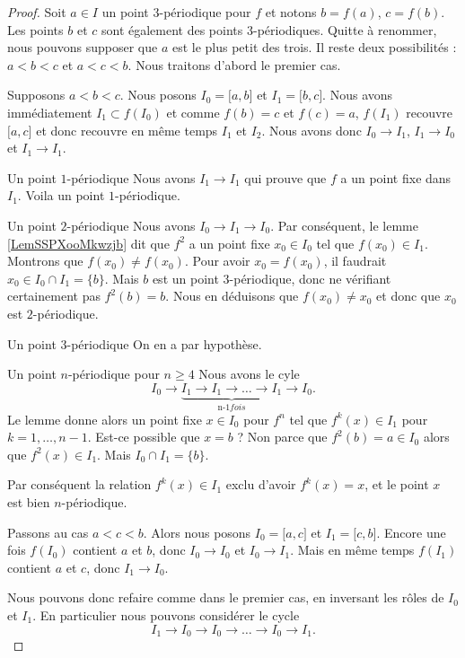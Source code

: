 \begin{proof}
    Soit \( a\in I\) un point \( 3\)-périodique pour \( f\) et notons \( b=f(a)\), \( c=f(b)\). Les points \( b\) et \( c\) sont également des points \( 3\)-périodiques. Quitte à renommer, nous pouvons supposer que \( a\) est le plus petit des trois. Il reste deux possibilités : \( a<b<c\) et \( a<c<b\). Nous traitons d'abord le premier cas.

    Supposons \( a<b<c\). Nous posons \( I_0=\mathopen[ a , b \mathclose]\) et \( I_1=\mathopen[ b , c \mathclose]\). Nous avons immédiatement \( I_1\subset f(I_0)\) et comme \( f(b)=c\) et \( f(c)=a\), \( f(I_1)\) recouvre \( \mathopen[ a , c \mathclose]\) et donc recouvre en même temps \( I_1\) et \( I_2\). Nous avons donc \( I_0\to I_1\), \( I_1\to I_0\) et \( I_1\to I_1\).
    \begin{subproof}
    \item[Un point \( 1\)-périodique]
        Nous avons \( I_1\to I_1\) qui prouve que \( f\) a un point fixe dans \( I_1\). Voila un point \( 1\)-périodique.
    \item[Un point \( 2\)-périodique]
        Nous avons \( I_0\to I_1\to I_0\). Par conséquent, le lemme \ref{LemSSPXooMkwzjb} dit que \( f^2\) a un point fixe \( x_0\in I_0\) tel que \( f(x_0)\in I_1\). Montrons que \( f(x_0)\neq f(x_0)\). Pour avoir \( x_0=f(x_0)\), il faudrait \( x_0\in I_0\cap I_1=\{ b \}\). Mais \( b\) est un point \( 3\)-périodique, donc ne vérifiant certainement pas \( f^2(b)=b\). Nous en déduisons que \( f(x_0)\neq x_0\) et donc que \( x_0\) est \( 2\)-périodique.
    \item[Un point \( 3\)-périodique]
        On en a par hypothèse.
    \item[Un point \( n\)-périodique pour \( n\geq 4\)]
        Nous avons le cyle
        \begin{equation}
            I_0\to \underbrace{I_1\to I_1\to\ldots\to I_1}_{\text{n-1} fois}\to I_0.
        \end{equation}
        Le lemme donne alors un point fixe \( x\in I_0\) pour \( f^n\) tel que \( f^k(x)\in I_1\) pour \( k=1,\ldots, n-1\). Est-ce possible que \( x=b\) ? Non parce que \( f^2(b)=a\in I_0\) alors que \( f^2(x)\in I_1\). Mais \( I_0\cap I_1=\{ b \}\).

        Par conséquent la relation \( f^k(x)\in I_1\) exclu d'avoir \( f^k(x)=x\), et le point \( x\) est bien \( n\)-périodique.
    \end{subproof} 
    
    Passons au cas \( a<c<b\). Alors nous posons \( I_0=\mathopen[ a , c \mathclose]\) et \( I_1=\mathopen[ c , b \mathclose]\). Encore une fois \( f(I_0)\) contient \( a\) et \( b\), donc \( I_0\to I_0\) et \( I_0\to I_1\). Mais en même temps \( f(I_1)\) contient \( a\) et \( c\), donc \( I_1\to I_0\).

    Nous pouvons donc refaire comme dans le premier cas, en inversant les rôles de \( I_0\) et \( I_1\). En particulier nous pouvons considérer le cycle
    \begin{equation}
        I_1\to I_0\to I_0\to\ldots\to I_0\to I_1.
    \end{equation}
\end{proof}


